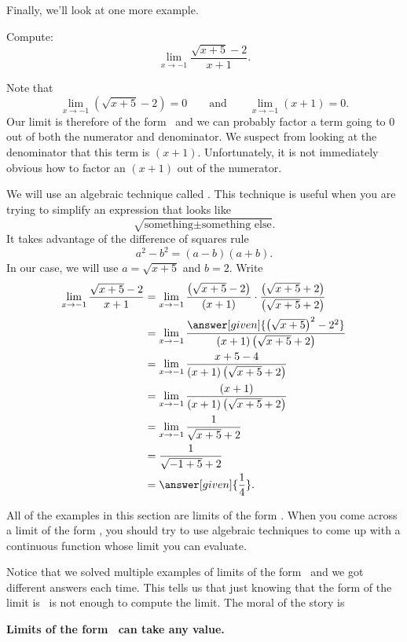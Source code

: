 \documentclass{ximera}
\begin{document}
Finally, we'll look at one more example.

\begin{example}
  Compute:
  \[
  \lim_{x\to-1} \frac{\sqrt{x+5}-2}{x+1}.
  \]

\begin{explanation} 
  Note that 
  \[
  \lim_{x\to-1} \left(\sqrt{x+5}-2\right)=0\qquad\text{and}\qquad\lim_{x\to -1} \left(x+1\right) =0.
  \]
  Our limit is therefore of the form \zeroOverZero\ and we
  can probably factor a term going to $0$ out of both the numerator
  and denominator.  We suspect from looking at the denominator that
  this term is $(x+1)$.  Unfortunately, it is not immediately obvious
  how to factor an $(x+1)$ out of the numerator.
 
  We will use an algebraic technique called .  This technique is useful when you are trying to
  simplify an expression that looks like
  \[
  \sqrt{\text{something} \pm \text{something else}}.
  \]
  It takes advantage of the difference of squares rule 
  \[
  a^2-b^2=(a-b)(a+b).
  \]
  In our case, we will use $a=\sqrt{x+5}$ and $b=2$.  Write
\begin{align*}
\lim_{x\to-1} \frac{\sqrt{x+5}-2}{x+1}&=
\lim_{x\to-1} \frac{\left(\sqrt{x+5}-2\right)}{(x+1)} \cdot \frac{\left(\sqrt{x+5}+2\right)}{\left(\sqrt{x+5}+2\right)} \\
&=\lim_{x\to-1} \frac{\answer[given]{\left(\sqrt{x+5}\right)^2-2^2}}{(x+1)\left(\sqrt{x+5}+2\right)} \\
&=\lim_{x\to-1} \frac{x+5-4}{(x+1)\left(\sqrt{x+5}+2\right)} \\
&=\lim_{x\to-1} \frac{(x+1)}{(x+1)\left(\sqrt{x+5}+2\right)} \\
&=\lim_{x\to-1} \frac{1}{\sqrt{x+5}+2}\\
&= \frac{1}{\sqrt{-1+5}+2}\\
&=\answer[given]{\frac{1}{4}}.
\end{align*}
\end{explanation}
\end{example}

All of the examples in this section are limits of the form \zeroOverZero.
When you come across a limit of the form \zeroOverZero, you should try
to use algebraic techniques to come up with a continuous
function whose limit you can evaluate.

Notice that we solved multiple examples of limits of the form
\zeroOverZero\ and we got different answers each time.  This tells us
that just knowing that the form of the limit is \zeroOverZero\ is not enough
to compute the limit. The moral of the story is
\begin{center}
  \textbf{Limits of the form \zeroOverZero\ can take any value.}
\end{center}
\end{document}

